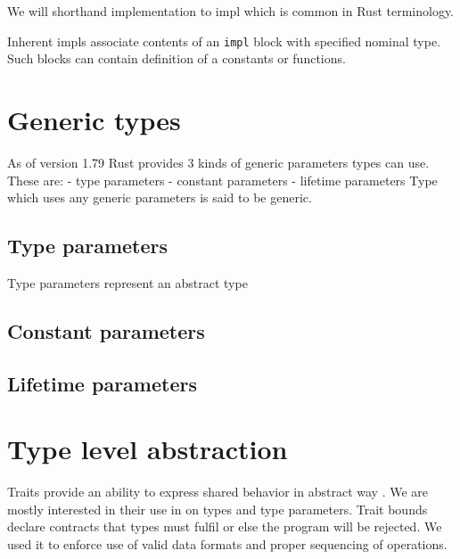 We will shorthand implementation to impl which is common in Rust terminology.

Inherent impls associate contents of an \texttt{impl} block with specified nominal type.
Such blocks can contain definition of a constants or functions. 

\section{Generic types}

As of version 1.79 Rust provides 3 kinds of generic parameters types can use. 
These are:
- type parameters
- constant parameters
- lifetime parameters
Type which uses any generic parameters is said to be generic.

\subsection{Type parameters}

Type parameters represent an abstract type 

\subsection{Constant parameters}


\subsection{Lifetime parameters}


\section{Type level abstraction}

Traits provide an ability to express shared behavior in abstract way \cite{rustbook}. We are mostly interested in their use in  on types and type parameters.
Trait bounds declare contracts that types must fulfil or else the program will be rejected. 
We used it to enforce use of valid data formats and proper sequencing of operations.

